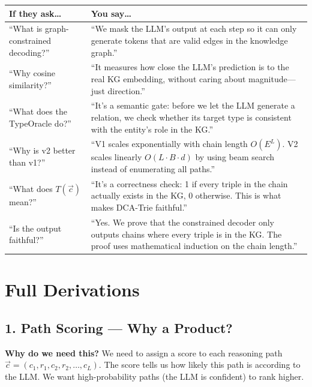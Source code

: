 \documentclass[11pt,a4paper]{article}
\newcommand{\whyt}[1]{\begin{whytbox}\textbf{Why do we need this?} #1\end{whytbox}\vspace{6pt}}
\begin{document}
\begin{center}
\small
\begin{tabular}{@{}p{5.5cm}p{9cm}@{}}
\toprule
If they ask\dots & You say\dots \\
\midrule
``What is graph-constrained decoding?'' &
``We mask the LLM's output at each step so it can only generate tokens that are valid edges in the knowledge graph.'' \\[4pt]
``Why cosine similarity?'' &
``It measures how close the LLM's prediction is to the real KG embedding, without caring about magnitude---just direction.'' \\[4pt]
``What does the TypeOracle do?'' &
``It's a semantic gate: before we let the LLM generate a relation, we check whether its target type is consistent with the entity's role in the KG.'' \\[4pt]
``Why is v2 better than v1?'' &
``V1 scales exponentially with chain length $O(E^L)$. V2 scales linearly $O(L \cdot B \cdot d)$ by using beam search instead of enumerating all paths.'' \\[4pt]
``What does $T(\vec{c})$ mean?'' &
``It's a correctness check: 1 if every triple in the chain actually exists in the KG, 0 otherwise. This is what makes DCA-Trie faithful.'' \\[4pt]
``Is the output faithful?'' &
``Yes. We prove that the constrained decoder only outputs chains where every triple is in the KG. The proof uses mathematical induction on the chain length.'' \\
\bottomrule
\end{tabular}
\end{center}

\newpage
\section*{Full Derivations}

\subsection{1. Path Scoring --- Why a Product?}

\whyt{
We need to assign a score to each reasoning path $\vec{c} = (c_1, r_1, c_2, r_2, \dots, c_L)$. The score tells us how likely this path is according to the LLM. We want high-probability paths (the LLM is confident) to rank higher.
}
\end{document}
